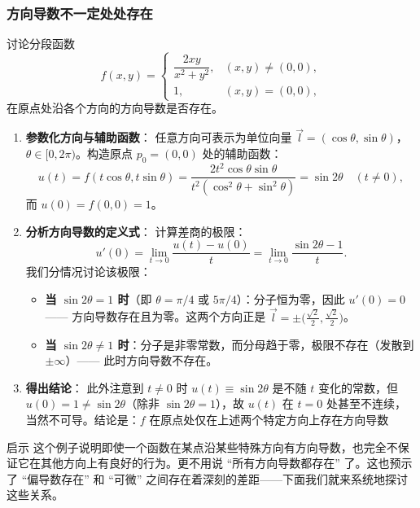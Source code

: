 \documentclass[lang=cn,11pt]{elegantbook}
\begin{document}
\subsubsection*{方向导数不一定处处存在}

\begin{exercise}[仅在某些方向存在方向导数] \label{ex:pdd-exists-limited}
讨论分段函数
\[
f(x,y)=
\begin{cases}
\dfrac{2xy}{x^2+y^2},&(x,y) \neq (0,0),\\[10pt]
1,&(x,y)=(0,0),
\end{cases}
\]
在原点处沿各个方向的方向导数是否存在。
\end{exercise}

\begin{solution}
\begin{enumerate}
  \item \textbf{参数化方向与辅助函数}：
  任意方向可表示为单位向量 $\vec l=(\cos\theta,\sin\theta)$，$\theta\in[0,2\pi)$。构造原点 $p_0=(0,0)$ 处的辅助函数：
  \[
  u(t)=f(t\cos\theta,t\sin\theta) =\frac{2t^2\cos\theta\sin\theta}{t^2(\cos^2\theta+\sin^2\theta)} =\sin 2\theta\quad(t \neq 0),
  \]
  而 $u(0)=f(0,0)=1$。
  
  \item \textbf{分析方向导数的定义式}：
  计算差商的极限：
  \[
  u'(0)=\lim_{t\to 0}\frac{u(t)-u(0)}{t} =\lim_{t\to 0}\frac{\sin 2\theta-1}{t}.
  \]
  我们分情况讨论该极限：
  \begin{itemize}
    \item \textbf{当 $\sin 2\theta=1$ 时}（即 $\theta=\pi/4$ 或 $5\pi/4$）：分子恒为零，因此 $u'(0)=0$ —— 方向导数存在且为零。这两个方向正是 $\vec l=\pm\bigl(\frac{\sqrt2}{2},\frac{\sqrt2}{2}\bigr)$。
    \item \textbf{当 $\sin 2\theta \neq 1$ 时}：分子是非零常数，而分母趋于零，极限不存在（发散到 $\pm\infty$）—— 此时方向导数不存在。
  \end{itemize}
  
  \item \textbf{得出结论}：
  此外注意到 $t \neq 0$ 时 $u(t)\equiv\sin 2\theta$ 是不随 $t$ 变化的常数，但 $u(0)=1 \neq \sin 2\theta$（除非 $\sin 2\theta=1$），故 $u(t)$ 在 $t=0$ 处甚至不连续，当然不可导。结论是：$f$ 在原点处仅在上述两个特定方向上存在方向导数
\end{enumerate}
\end{solution}

\begin{note}{启示}
这个例子说明即使一个函数在某点沿某些特殊方向有方向导数，也完全不保证它在其他方向上有良好的行为。更不用说 ``所有方向导数都存在'' 了。这也预示了 ``偏导数存在'' 和 ``可微'' 之间存在着深刻的差距——下面我们就来系统地探讨这些关系。
\end{note}
\end{document}
